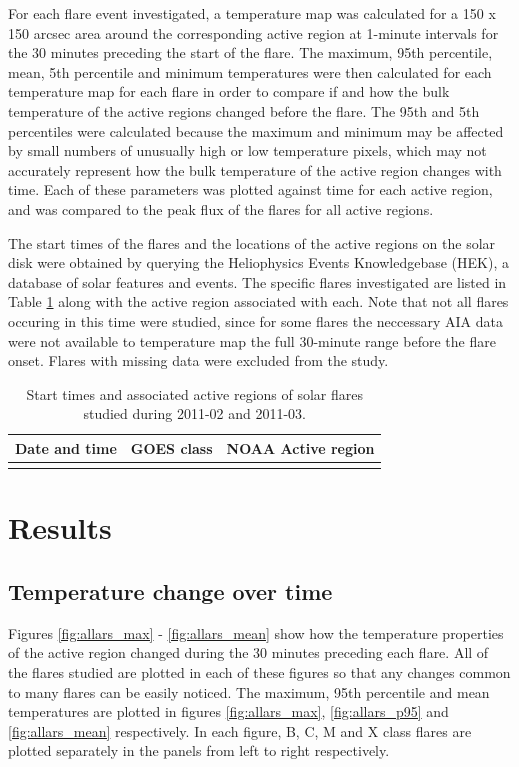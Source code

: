 \documentclass[referee,a4paper,12pt]{swsc}
\begin{document}
\begin{linenumbers}
For each flare event investigated, a temperature map was calculated for a 150 x 150 arcsec area around the corresponding active region at 1-minute intervals for the 30 minutes preceding the start of the flare.
The maximum, 95th percentile, mean, 5th percentile and minimum temperatures were then calculated for each temperature map for each flare in order to compare if and how the bulk temperature of the active regions changed before the flare.
The 95th and 5th percentiles were calculated because the maximum and minimum may be affected by small numbers of unusually high or low temperature pixels, which may not accurately represent how the bulk temperature of the active region changes with time. %
Each of these parameters was plotted against time for each active region, and was compared to the peak flux of the flares for all active regions.

The start times of the flares and the locations of the active regions on the solar disk were obtained by querying the Heliophysics Events Knowledgebase (HEK), a database of solar features and events. %
The specific flares investigated are listed in Table \ref{tab:flares} along with the active region associated with each.
Note that not all flares occuring in this time were studied, since for some flares the neccessary AIA data were not available to temperature map the full 30-minute range before the flare onset.
Flares with missing data were excluded from the study.

\begin{longtable}{c|c|c}
	\caption{Start times and associated active regions of solar flares studied during 2011-02 and 2011-03.}\\
		Date and time & GOES class & NOAA Active region \\
		\hline
		
	\label{tab:flares}
\end{longtable}

\section{Results}
\subsection{Temperature change over time} \label{sec:temps_v_time}
Figures \ref{fig:allars_max} - \ref{fig:allars_mean} show how the temperature properties of the active region changed during the 30 minutes preceding each flare.
All of the flares studied are plotted in each of these figures so that any changes common to many flares can be easily noticed.
The maximum, 95th percentile and mean temperatures are plotted in figures \ref{fig:allars_max}, \ref{fig:allars_p95} and \ref{fig:allars_mean} respectively.
In each figure, B, C, M and X class flares are plotted separately in the panels from left to right respectively.


\end{linenumbers}
\end{document}
